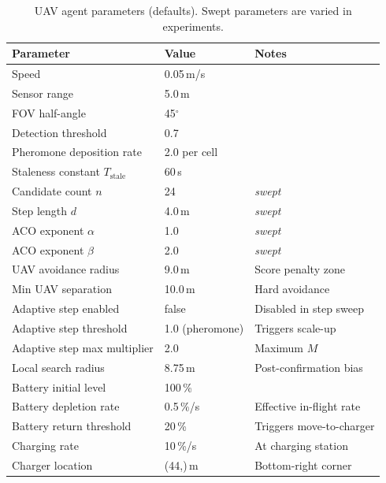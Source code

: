 \begin{table}[h]
\centering
\caption{UAV agent parameters (defaults). Swept parameters are varied in experiments.}
\label{tab:params_uav}
\begin{tabular}{lll}
\toprule
Parameter & Value & Notes \\
\midrule
Speed                         & 0.05\,m/s                 & \\
Sensor range                  & 5.0\,m                    & \\
FOV half-angle                & 45$^\circ$                & \\
Detection threshold           & 0.7                       & \\
Pheromone deposition rate     & 2.0 per cell              & \\
Staleness constant $T_\text{stale}$ & 60\,s             & \\
Candidate count $n$           & 24                        & \emph{swept} \\
Step length $d$               & 4.0\,m                    & \emph{swept} \\
ACO exponent $\alpha$         & 1.0                       & \emph{swept} \\
ACO exponent $\beta$          & 2.0                       & \emph{swept} \\
UAV avoidance radius          & 9.0\,m                    & Score penalty zone \\
Min UAV separation            & 10.0\,m                   & Hard avoidance \\
Adaptive step enabled         & false                     & Disabled in step sweep \\
Adaptive step threshold       & 1.0 (pheromone)           & Triggers scale-up \\
Adaptive step max multiplier  & 2.0                       & Maximum $M$ \\
Local search radius           & 8.75\,m                   & Post-confirmation bias \\
Battery initial level         & 100\,\%                   & \\
Battery depletion rate        & 0.5\,\%/s                 & Effective in-flight rate \\
Battery return threshold      & 20\,\%                    & Triggers move-to-charger \\
Charging rate                 & 10\,\%/s                  & At charging station \\
Charger location              & (44,\;23)\,m              & Bottom-right corner \\
\bottomrule
\end{tabular}
\end{table}
